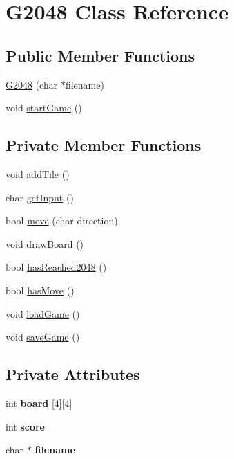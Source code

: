 \hypertarget{class_g2048}{}\section{G2048 Class Reference}
\label{class_g2048}
\subsection*{Public Member Functions}
\begin{DoxyCompactItemize}
\item 
\hyperlink{class_g2048_a12ea435afa1a6c98b55fb9de1f7e9a7c}{G2048} (char $\ast$filename)
\item 
void \hyperlink{class_g2048_a27e9fd04da38f14bceb4e03fab1ab8b5}{start\+Game} ()
\end{DoxyCompactItemize}
\subsection*{Private Member Functions}
\begin{DoxyCompactItemize}
\item 
void \hyperlink{class_g2048_af65fedafade111894861afd881aa054d}{add\+Tile} ()
\item 
char \hyperlink{class_g2048_ac9dcd2edd415eadbfa32db31ce305e4e}{get\+Input} ()
\item 
bool \hyperlink{class_g2048_a00666950d115041730254e15c838e369}{move} (char direction)
\item 
void \hyperlink{class_g2048_a4b52b206d07bd7591cd97b23745348e5}{draw\+Board} ()
\item 
bool \hyperlink{class_g2048_a918c3fa187424a332e830f6c637825b1}{has\+Reached2048} ()
\item 
bool \hyperlink{class_g2048_a19798f8e7d1c579e52629b46f9f9d285}{has\+Move} ()
\item 
void \hyperlink{class_g2048_ae355fcde55c0ab0e52ff649ca7adf03e}{load\+Game} ()
\item 
void \hyperlink{class_g2048_a335bb5d25c76f2e2548115e64091afc0}{save\+Game} ()
\end{DoxyCompactItemize}
\subsection*{Private Attributes}
\begin{DoxyCompactItemize}
\item 
\hypertarget{class_g2048_ad6da4be873b6ea313a4fed6b8332c6d4}{}int {\bfseries board} \mbox{[}4\mbox{]}\mbox{[}4\mbox{]}\label{class_g2048_ad6da4be873b6ea313a4fed6b8332c6d4}

\item 
\hypertarget{class_g2048_a48eb939e2be834a99ad081797acfbbe8}{}int {\bfseries score}\label{class_g2048_a48eb939e2be834a99ad081797acfbbe8}

\item 
\hypertarget{class_g2048_aa3942577889dda8cc35589ff41639ab2}{}char $\ast$ {\bfseries filename}\label{class_g2048_aa3942577889dda8cc35589ff41639ab2}

\end{DoxyCompactItemize}



